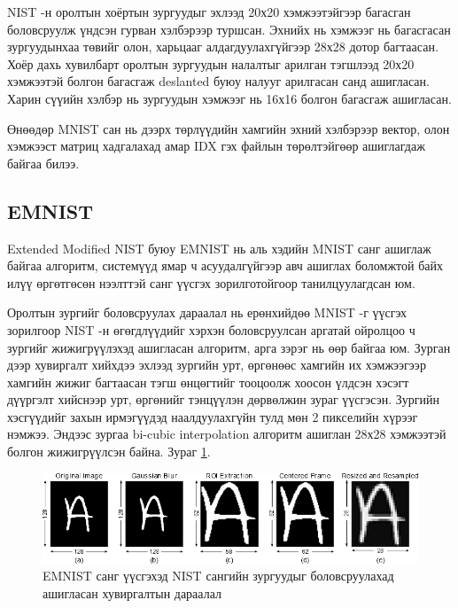 NIST -н оролтын хоёртын зургуудыг эхлээд 20х20 хэмжээтэйгээр багасган боловсруулж үндсэн гурван хэлбэрээр туршсан. Эхнийх нь хэмжээг нь багасгасан зургуудынхаа төвийг олон, харьцааг алдагдуулахгүйгээр 28х28 дотор багтаасан. Хоёр дахь хувилбарт оролтын зургуудын налалтыг арилган тэгшлээд 20х20 хэмжээтэй болгон багасгаж deslanted буюу налууг арилгасан санд ашигласан. Харин сүүийн хэлбэр нь зургуудын хэмжээг нь 16х16 болгон багасгаж ашигласан.

Өнөөдөр MNIST сан нь дээрх төрлүүдийн хамгийн эхний хэлбэрээр вектор, олон хэмжээст матриц хадгалахад амар IDX гэх файлын төрөлтэйгөөр ашиглагдаж байгаа билээ.

\subsection{EMNIST \cite{emnist}}

Extended Modified NIST буюу EMNIST нь аль хэдийн MNIST санг ашиглаж байгаа алгоритм, системүүд ямар ч асуудалгүйгээр авч ашиглах боломжтой байх илүү өргөтгөсөн нээлттэй санг үүсгэх зорилготойгоор танилцуулагдсан юм.

Оролтын зургийг боловсруулах дараалал нь ерөнхийдөө MNIST\cite{mnist} -г үүсгэх зорилгоор NIST\cite{nist19} -н өгөгдлүүдийг хэрхэн боловсруулсан аргатай ойролцоо ч зургийг жижигрүүлэхэд ашигласан алгоритм, арга зэрэг нь өөр байгаа юм. Зурган дээр хувиргалт хийхдээ эхлээд зургийн урт, өргөнөөс хамгийн их хэмжээгээр хамгийн жижиг багтаасан тэгш өнцөгтийг тооцоолж хоосон үлдсэн хэсэгт дүүргэлт хийснээр урт, өргөнийг тэнцүүлэн дөрвөлжин зураг үүсгэсэн. Зургийн хэсгүүдийг захын ирмэгүүдэд наалдуулахгүйн тулд мөн 2 пикселийн хүрээг нэмжээ. Эндээс зургаа bi-cubic interpolation алгоритм ашиглан 28х28 хэмжээтэй болгон жижигрүүлсэн байна. Зураг \ref{fig:emnist-conversion}.

\begin{figure}[H]
	\centering
	\includegraphics[width=1\linewidth]{images/emnist}
	\caption{EMNIST санг үүсгэхэд NIST сангийн зургуудыг боловсруулахад ашигласан хувиргалтын дараалал \cite{emnist}}
	\label{fig:emnist-conversion}
\end{figure}

